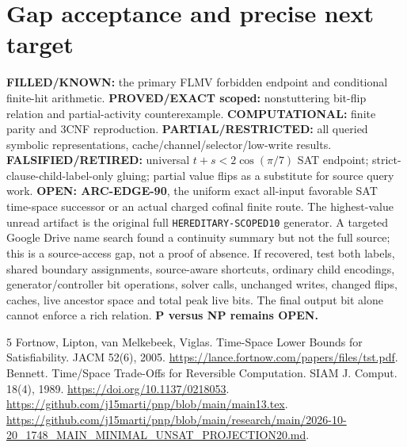 \documentclass[11pt]{article}
\begin{document}
\section{Gap acceptance and precise next target}
\noindent\textbf{FILLED/KNOWN:} the primary FLMV forbidden endpoint and conditional finite-hit arithmetic. \textbf{PROVED/EXACT scoped:} nonstuttering bit-flip relation and partial-activity counterexample. \textbf{COMPUTATIONAL:} finite parity and 3CNF reproduction. \textbf{PARTIAL/RESTRICTED:} all queried symbolic representations, cache/channel/selector/low-write results. \textbf{FALSIFIED/RETIRED:} universal $t+s<2\cos(\pi/7)$ SAT endpoint; strict-clause-child-label-only gluing; partial value flips as a substitute for source query work. \textbf{OPEN: ARC-EDGE-90}, the uniform exact all-input favorable SAT time-space successor or an actual charged cofinal finite route.
The highest-value unread artifact is the original full \texttt{HEREDITARY-SCOPED10} generator. A targeted Google Drive name search found a continuity summary but not the full source; this is a source-access gap, not a proof of absence. If recovered, test both labels, shared boundary assignments, source-aware shortcuts, ordinary child encodings, generator/controller bit operations, solver calls, unchanged writes, changed flips, caches, live ancestor space and total peak live bits. The final output bit alone cannot enforce a rich relation. \textbf{P versus NP remains OPEN.}

\begin{thebibliography}{5}
 Fortnow, Lipton, van Melkebeek, Viglas. Time-Space Lower Bounds for Satisfiability. JACM 52(6), 2005. \url{https://lance.fortnow.com/papers/files/tst.pdf}.
 Bennett. Time/Space Trade-Offs for Reversible Computation. SIAM J. Comput. 18(4), 1989. \url{https://doi.org/10.1137/0218053}.
 \url{https://github.com/j15marti/pnp/blob/main/main13.tex}.
 \url{https://github.com/j15marti/pnp/blob/main/research/main/2026-10-20_1748_MAIN_MINIMAL_UNSAT_PROJECTION20.md}.
\end{thebibliography}
\end{document}
